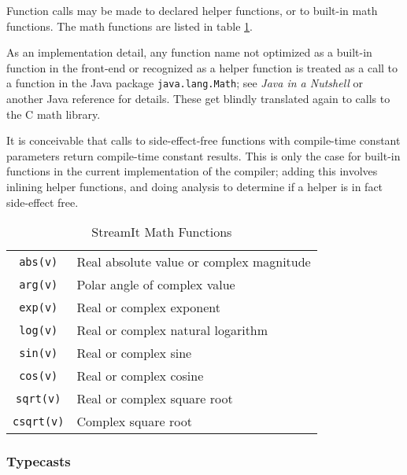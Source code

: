\documentclass[11pt]{article}
\begin{document}
Function calls may be made to declared helper functions, or to
built-in math functions.  The math functions are listed in table
\ref{tab:math-functions}.

\begin{note}
  As an implementation detail, any function name not optimized as a
  built-in function in the front-end or recognized as a %
  helper function is treated as a call to a function in the Java
  package \lstinline|java.lang.Math|; see \emph{Java in a Nutshell} or
  another Java reference for details.  These get blindly translated
  again to calls to the C math library.
\end{note}

\begin{note}
  It is conceivable that calls to side-effect-free functions with
  compile-time constant parameters return compile-time constant
  results.  This is only the case for built-in functions in the
  current implementation of the compiler; adding this involves
  inlining helper functions, and doing analysis to determine if a
  helper is in fact side-effect free.
\end{note}

\begin{table}[htbp]
  \begin{center}
    \begin{tabular}{cl}
      \toprule
      \texttt{abs(v)} & Real absolute value or complex magnitude \\
      \texttt{arg(v)} & Polar angle of complex value \\
      \texttt{exp(v)} & Real or complex exponent \\
      \texttt{log(v)} & Real or complex natural logarithm \\
      \texttt{sin(v)} & Real or complex sine \\
      \texttt{cos(v)} & Real or complex cosine \\
      \texttt{sqrt(v)} & Real or complex square root \\
      \texttt{csqrt(v)} & Complex square root \\
      \bottomrule
    \end{tabular}
    \caption{StreamIt Math Functions}
    \label{tab:math-functions}
  \end{center}
\end{table}

\subsubsection{Typecasts}
\end{document}
